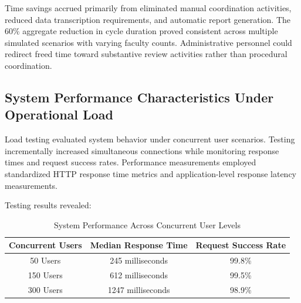 \documentclass[conference]{IEEEtran}
\begin{document}
\begin{table}[!h]
\centering
\caption{Comparison of Evaluation Workflow Duration}
\label{table:efficiency}
\end{table}

Time savings accrued primarily from eliminated manual coordination activities, reduced data transcription requirements, and automatic report generation. The 60\% aggregate reduction in cycle duration proved consistent across multiple simulated scenarios with varying faculty counts. Administrative personnel could redirect freed time toward substantive review activities rather than procedural coordination.

\subsection{System Performance Characteristics Under Operational Load}
\label{subsec:performance}

Load testing evaluated system behavior under concurrent user scenarios. Testing incrementally increased simultaneous connections while monitoring response times and request success rates. Performance measurements employed standardized HTTP response time metrics and application-level response latency measurements.

Testing results revealed:

\begin{table}[!h]
\centering
\caption{System Performance Across Concurrent User Levels}
\label{table:performance}
\begin{tabular}{|ccc|}
\hline
\textbf{Concurrent Users} & \textbf{Median Response Time} & \textbf{Request Success Rate} \\
\hline
50 Users & 245 milliseconds & 99.8\% \\
150 Users & 612 milliseconds & 99.5\% \\
300 Users & 1247 milliseconds & 98.9\% \\
\hline
\end{tabular}
\end{table}
\end{document}
